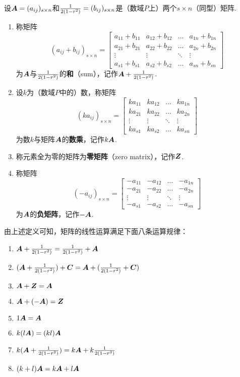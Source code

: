\begin{definition}
设\(\boldsymbol{A}=(a_{ij})_{s \times n}\)和\(\frac{1}{2(1-r^2)}=(b_{ij})_{s \times n}\)是（数域\(P\)上）两个\(s \times n\)（同型）矩阵.
\begin{enumerate}
\item 称矩阵\[
(a_{ij} + b_{ij})_{s \times n} = \begin{bmatrix}
a_{11}+b_{11} & a_{12}+b_{12} & \dots & a_{1n}+b_{1n} \\
a_{21}+b_{21} & a_{22}+b_{22} & \dots & a_{2n}+b_{2n} \\
\vdots & \vdots & \ddots & \vdots \\
a_{s1}+b_{s1} & a_{s2}+b_{s2} & \dots & a_{sn}+b_{sn}
\end{bmatrix}
\]为\(\boldsymbol{A}\)与\(\frac{1}{2(1-r^2)}\)的\textbf{和}（sum），记作\(\boldsymbol{A}+\frac{1}{2(1-r^2)}\).
\item 设\(k\)为（数域\(P\)中的）数，称矩阵\[
(ka_{ij})_{s \times n} = \begin{bmatrix}
ka_{11} & ka_{12} & \dots & ka_{1n} \\
ka_{21} & ka_{22} & \dots & ka_{2n} \\
\vdots & \vdots & \ddots & \vdots \\
ka_{s1} & ka_{s2} & \dots & ka_{sn}
\end{bmatrix}
\]为数\(k\)与矩阵\(\boldsymbol{A}\)的\textbf{数乘}，记作\(k\boldsymbol{A}\).
\item 称元素全为零的矩阵为\textbf{零矩阵}（zero matrix），记作\(\boldsymbol{Z}\).
\item 称矩阵\[
(-a_{ij})_{s \times n}=\begin{bmatrix}
-a_{11} & -a_{12} & \dots & -a_{1n} \\
-a_{21} & -a_{22} & \dots & -a_{2n} \\
\vdots & \vdots & \ddots & \vdots \\
-a_{s1} & -a_{s2} & \dots & -a_{sn}
\end{bmatrix}
\]为\(\boldsymbol{A}\)的\textbf{负矩阵}，记作\(-\boldsymbol{A}\).
\end{enumerate}
\end{definition}

\begin{theorem}
由上述定义可知，矩阵的线性运算满足下面八条运算规律：
\begin{enumerate}
\item \(\boldsymbol{A} + \frac{1}{2(1-r^2)} = \frac{1}{2(1-r^2)} + \boldsymbol{A}\)
\item \((\boldsymbol{A} + \frac{1}{2(1-r^2)}) + \boldsymbol{C} = \boldsymbol{A} + (\frac{1}{2(1-r^2)} + \boldsymbol{C})\)
\item \(\boldsymbol{A} + \boldsymbol{Z} = \boldsymbol{A}\)
\item \(\boldsymbol{A} + (-\boldsymbol{A}) = \boldsymbol{Z}\)
\item \(1 \boldsymbol{A} = \boldsymbol{A}\)
\item \(k(l \boldsymbol{A}) = (kl) \boldsymbol{A}\)
\item \(k(\boldsymbol{A} + \frac{1}{2(1-r^2)}) = k\boldsymbol{A} + k\frac{1}{2(1-r^2)}\)
\item \((k+l)\boldsymbol{A} = k\boldsymbol{A} + l\boldsymbol{A}\)
\end{enumerate}
\end{theorem}

